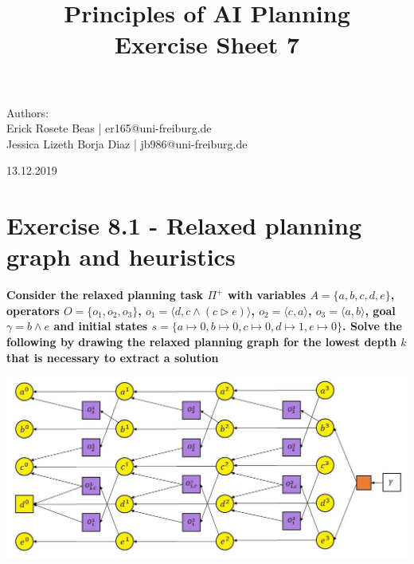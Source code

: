 \documentclass[12pt,a4paper]{article}
\title{\textbf{Principles of AI Planning
		\\{\Large Exercise Sheet 7}}}
\begin{document}
\begin{flushleft}
	Authors:\\
	Erick Rosete Beas | er165@uni-freiburg.de\\
	Jessica Lizeth Borja Diaz | jb986@uni-freiburg.de\\
\end{flushleft}
{\let\newpage\relax\maketitle}
\begin{center} 
	\large 13.12.2019 
\end{center}


\section*{Exercise 8.1 - Relaxed planning graph and heuristics}
\textbf{Consider the relaxed planning task $\Pi^+$ with variables 
$A=\{a,b,c,d,e\}$, operators $O=\{o_1,o_2,o_3\}$, $o_1=\langle d, c \land (c \triangleright e)\rangle$,
$o_2= \langle c , a \rangle$, $o_3= \langle a, b\rangle$, goal
$\gamma = b \land e$ and initial states $s=\{ a\mapsto 0, 
b\mapsto 0, c \mapsto 0, d \mapsto 1, e \mapsto 0 \}$. Solve the following
by drawing the relaxed planning graph for the lowest depth $k$
that is necessary to extract a solution}
\begin{center}
	\includegraphics[scale=0.5]{img1.jpg}\\
\end{center}
\end{document}
